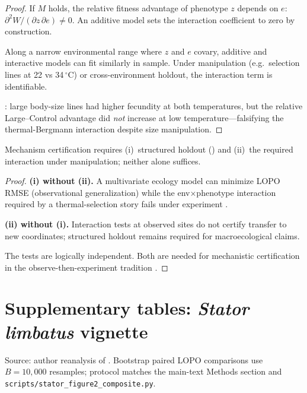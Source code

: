 \documentclass[11pt]{article}
\begin{document}
\begin{proof}
If $M$ holds, the relative fitness advantage of phenotype $z$ depends on
$e$: $\partial^2 W/(\partial z\,\partial e)\neq 0$.  An additive model sets
the interaction coefficient to zero by construction.

Along a narrow environmental range where $z$ and $e$ covary, additive and
interactive models can fit similarly in sample.  Under manipulation (e.g.\
selection lines at 22 vs 34\,$^\circ$C) or cross-environment holdout, the
interaction term is identifiable.

\citet{stillwell2008}: large body-size lines had higher fecundity at both
temperatures, but the relative Large--Control advantage did \emph{not}
increase at low temperature---falsifying the thermal-Bergmann interaction
despite size manipulation.
\end{proof}

\begin{theorem}
\label{thm:esm-two-test}
Mechanism certification requires (i)~structured holdout (\Etwo) and
(ii)~the required interaction under manipulation; neither alone suffices.
\end{theorem}

\begin{proof}
\textbf{(i) without (ii).}  A multivariate ecology model can minimize LOPO
RMSE (observational generalization) while the env$\times$phenotype
interaction required by a thermal-selection story fails under experiment
\citep{stillwell2007,stillwell2008}.

\textbf{(ii) without (i).}  Interaction tests at observed sites do not
certify transfer to new coordinates; structured holdout remains required
for macroecological claims.

The tests are logically independent.  Both are needed for mechanistic
certification in the observe-then-experiment tradition
\citep{lande1983,kingsolver2001}.
\end{proof}

\section{Supplementary tables: \emph{Stator limbatus} vignette}
\label{sec:supp-tables}

Source: author reanalysis of \citet{stillwell2007}.  Bootstrap paired LOPO
comparisons use $B=10{,}000$ resamples; protocol matches the main-text
Methods section and \texttt{scripts/stator\_figure2\_composite.py}.
\end{document}
